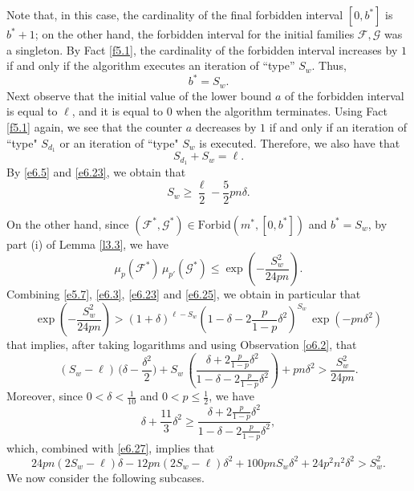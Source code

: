 \documentclass[10pt]{amsart}
\theoremstyle{remark}
\newcommand{\meg}{\geqslant}
\newcommand{\mik}{\leqslant}
\newcommand{\Fcal}{\mathcal{F}}
\newcommand{\Gcal}{\mathcal{G}}
\begin{document}
Note that, in this case, the cardinality of the final forbidden interval $[0,b^*]$ is $b^*+1$;
on the other hand, the forbidden interval for the initial families $\Fcal,\Gcal$ was a singleton.
By Fact \ref{f5.1}, the cardinality of the forbidden interval increases by $1$
if and only if the algorithm executes an iteration of ``type'' $S_w$. Thus,
\begin{equation} \label{e6.22}
b^*=S_w.
\end{equation}
Next observe that the initial value of the lower bound $a$ of the forbidden interval is equal to $\ell$,
and it is equal to $0$ when the algorithm terminates. Using Fact \ref{f5.1} again, we see that
the counter $a$ decreases by $1$ if and only if an iteration of ``type" $S_{d_1}$ or an iteration
of ``type" $S_w$ is executed. Therefore, we also have that
\begin{equation} \label{e6.23}
S_{d_1}+S_w=\ell.
\end{equation}
By \eqref{e6.5} and \eqref{e6.23}, we obtain that
\begin{equation} \label{e6.24}
S_w\meg \frac{\ell}{2}-\frac52 pn\delta.
\end{equation}

On the other hand, since $\left(\Fcal^*,\Gcal^*\right)\in\mathrm{Forbid}(m^*,[0,b^*])$ and $b^*=S_w$,
by part (i) of Lemma \ref{l3.3}, we have
\begin{equation} \label{e6.25}
\mu_p(\Fcal^*)\,\mu_{p'}(\Gcal^*)\mik \exp\left(-\frac{S_w^2}{24pn}\right).
\end{equation}
Combining \eqref{e5.7}, \eqref{e6.3}, \eqref{e6.23} and \eqref{e6.25}, we obtain in particular that
\begin{equation} \label{e6.26}
\exp\left(-\frac{S_w^2}{24pn}\right) > (1+\delta)^{\ell-S_w} \left(1-\delta-2\frac{p}{1-p}\delta^2\right)^{S_w}\,
\exp\left(-pn\delta^2\right)
\end{equation}
that implies, after taking logarithms and using Observation \ref{o6.2}, that
\begin{equation} \label{e6.27}
(S_w-\ell)\, \Big(\delta-\frac{\delta^2}{2}\Big) +
S_w\, \left(\frac{\delta+2\frac{p}{1-p}\delta^2}{1-\delta-2\frac{p}{1-p}\delta^2}\right)+pn\delta^2
> \frac{S_w^2}{24pn}.
\end{equation}
Moreover, since $0<\delta<\frac{1}{10}$ and $0<p\mik \frac12$, we have
\begin{equation} \label{e6.28}
\delta+\frac{11}{3}\delta^2 \meg \frac{\delta+2\frac{p}{1-p}\delta^2}{1-\delta-2\frac{p}{1-p}\delta^2},
\end{equation}
which, combined with \eqref{e6.27}, implies that
\begin{equation} \label{e6.29}
24pn(2S_w-\ell)\delta - 12pn(2S_w-\ell)\delta^2 + 100 pnS_w\delta^2 +
24 p^2n^2\delta^2> S_w^2.
\end{equation}
We now consider the following subcases.
\end{document}
